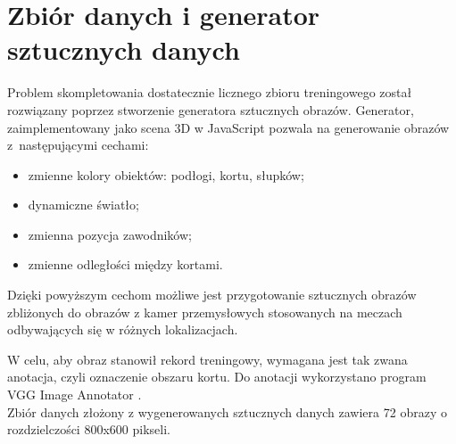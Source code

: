 \newpage
\section{Zbiór danych i generator sztucznych danych}
\label{sec:generator}

Problem skompletowania dostatecznie licznego zbioru treningowego został rozwiązany poprzez stworzenie generatora sztucznych obrazów.
Generator, zaimplementowany jako scena 3D w JavaScript pozwala na generowanie obrazów z~następującymi cechami:

\begin{itemize}
	\item zmienne kolory obiektów: podłogi, kortu, słupków;
	\item dynamiczne światło;
	\item zmienna pozycja zawodników;
	\item zmienne odległości między kortami.
\end{itemize}

Dzięki powyższym cechom możliwe jest przygotowanie sztucznych obrazów zbliżonych do obrazów z kamer przemysłowych stosowanych na meczach odbywających się w różnych lokalizacjach.

W celu, aby obraz stanowił rekord treningowy, wymagana jest tak zwana anotacja, czyli oznaczenie obszaru kortu. Do anotacji wykorzystano program VGG Image Annotator \cite{vgg-via}.
\\
Zbiór danych złożony z wygenerowanych sztucznych danych zawiera 72 obrazy o rozdzielczości 800x600 pikseli.

